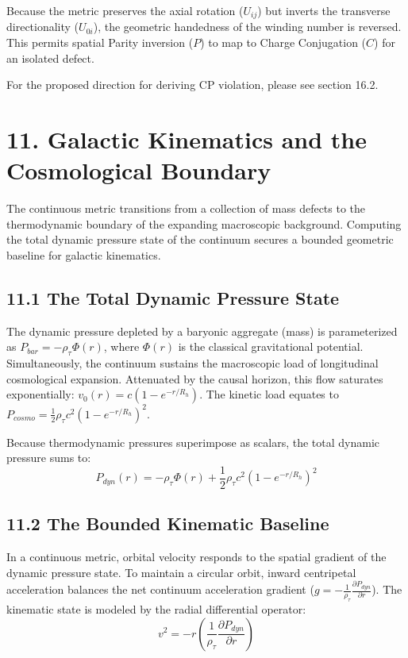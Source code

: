 Because the metric preserves the axial rotation ($U_{ij}$) but inverts the transverse directionality ($U_{0i}$), the geometric handedness of the winding number is reversed. This permits spatial Parity inversion ($P$) to map to Charge Conjugation ($C$) for an isolated defect. 

For the proposed direction for deriving CP violation, please see section 16.2.

\section*{11. Galactic Kinematics and the Cosmological Boundary} \label{sec:macroscopic_basin}
The continuous metric transitions from a collection of mass defects to the thermodynamic boundary of the expanding macroscopic background. Computing the total dynamic pressure state of the continuum secures a bounded geometric baseline for galactic kinematics.

\subsection*{11.1 The Total Dynamic Pressure State} 
The dynamic pressure depleted by a baryonic aggregate (mass) is parameterized as $P_{bar} = -\rho_\tau \Phi(r)$, where $\Phi(r)$ is the classical gravitational potential. Simultaneously, the continuum sustains the macroscopic load of longitudinal cosmological expansion. Attenuated by the causal horizon, this flow saturates exponentially: $v_0(r) = c(1 - e^{-r/R_h})$. The kinetic load equates to $P_{cosmo} = \frac{1}{2}\rho_\tau c^2 (1 - e^{-r/R_h})^2$.

Because thermodynamic pressures superimpose as scalars, the total dynamic pressure sums to: 
\begin{equation} 
P_{dyn}(r) = -\rho_\tau \Phi(r) + \frac{1}{2}\rho_\tau c^2 \left( 1 - e^{-r/R_h} \right)^2 \label{eq:total_pdyn_sds} 
\end{equation}

\subsection*{11.2 The Bounded Kinematic Baseline} 
In a continuous metric, orbital velocity responds to the spatial gradient of the dynamic pressure state. To maintain a circular orbit, inward centripetal acceleration balances the net continuum acceleration gradient ($g = -\frac{1}{\rho_\tau} \frac{\partial P_{dyn}}{\partial r}$). The kinematic state is modeled by the radial differential operator: 
\begin{equation} 
v^2 = -r \left( \frac{1}{\rho_\tau} \frac{\partial P_{dyn}}{\partial r} \right) 
\end{equation}

